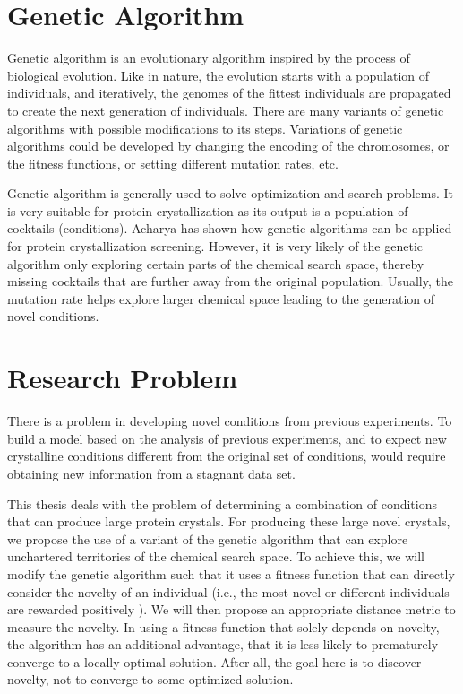 \section{Genetic Algorithm} \label{intro:genetic}
Genetic algorithm  is an evolutionary algorithm inspired by the process of biological evolution. Like in nature, the evolution starts with a population of individuals, and iteratively, the genomes of the fittest individuals are propagated to create the next generation of individuals. There are many variants of genetic algorithms with possible modifications to its steps. Variations of genetic algorithms could be developed by changing the encoding of the chromosomes, or the fitness functions, or setting different mutation rates, etc.  

Genetic algorithm is generally used to solve optimization and search problems. It is very suitable for protein crystallization as its output is a population of cocktails (conditions). Acharya \cite{SamyamThesis} has shown  how genetic algorithms can be applied for protein crystallization screening. However, it is very likely of the genetic algorithm only exploring certain parts of the chemical search space, thereby missing cocktails that are further away from the original population. Usually, the mutation rate helps explore larger chemical space leading to  the generation of novel conditions.

\section{Research Problem} \label{intro:research}
There is a problem in developing novel conditions from previous experiments. To build a model based on the analysis of previous experiments, and to expect new crystalline conditions different from the original set of conditions, would require obtaining new information from a stagnant data set.

This thesis deals with the problem of determining a combination of conditions that can produce large protein crystals. For producing these large novel crystals, we propose the use of a variant of the genetic algorithm that can explore unchartered territories of the chemical search space.
To achieve this, we will modify the genetic algorithm such that it uses a fitness function that can directly consider the novelty of an individual (i.e., the most novel or different individuals are rewarded positively \cite{Novelty}). 
We will then propose an appropriate distance metric to measure the novelty. 
In using a fitness function that solely depends on novelty, the algorithm has an additional advantage, that it is less likely to prematurely converge to a locally optimal solution. After all, the goal here is to discover novelty, not to converge to some optimized solution.

